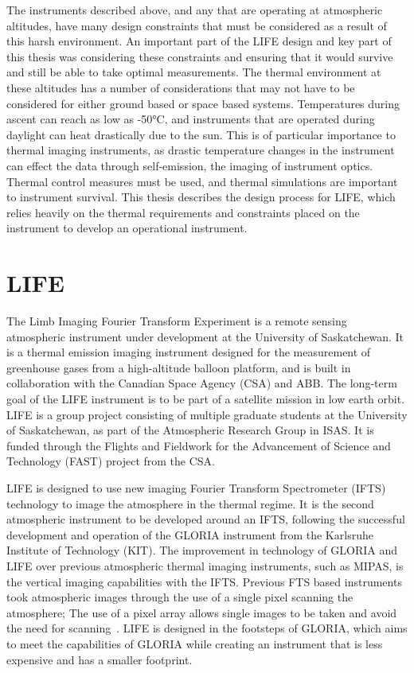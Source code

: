 The instruments described above, and any that are operating at atmospheric altitudes, have many design constraints that must be considered as a result of this harsh environment. An important part of the LIFE design and key part of this thesis was considering these constraints and ensuring that it would survive and still be able to take optimal measurements. The thermal environment at these altitudes has a number of considerations that may not have to be considered for either ground based or space based systems. Temperatures during ascent can reach as low as -50°C, and instruments that are operated during daylight can heat drastically due to the sun. This is of particular importance to thermal imaging instruments, as drastic temperature changes in the instrument can effect the data through self-emission, the imaging of instrument optics. Thermal control measures must be used, and thermal simulations are important to instrument survival. This thesis describes the design process for LIFE, which relies heavily on the thermal requirements and constraints placed on the instrument to develop an operational instrument.

\section{LIFE}
The Limb Imaging Fourier Transform Experiment is a remote sensing atmospheric instrument under development at the University of Saskatchewan. It is a thermal emission imaging instrument designed for the measurement of greenhouse gases from a high-altitude balloon platform, and is built in collaboration with the Canadian Space Agency (CSA) and ABB. The long-term goal of the LIFE instrument is to be part of a satellite mission in low earth orbit. LIFE is a group project consisting of multiple graduate students at the University of Saskatchewan, as part of the Atmospheric Research Group in ISAS. It is funded through the Flights and Fieldwork for the Advancement of Science and Technology (FAST) project from the CSA. 

LIFE is designed to use new imaging Fourier Transform Spectrometer (IFTS) technology to image the atmosphere in the thermal regime. It is the second atmospheric instrument to be developed around an IFTS, following the successful development and operation of the GLORIA instrument from the Karlsruhe Institute of Technology (KIT). The improvement in technology of GLORIA and LIFE over previous atmospheric thermal imaging instruments, such as MIPAS, is the vertical imaging capabilities with the IFTS. Previous FTS based instruments took atmospheric images through the use of a single pixel scanning the atmosphere; The use of a pixel array allows single images to be taken and avoid the need for scanning~\citep{GLORIA_objectives}. LIFE is designed in the footsteps of GLORIA, which aims to meet the capabilities of GLORIA while creating an instrument that is less expensive and has a smaller footprint. 

